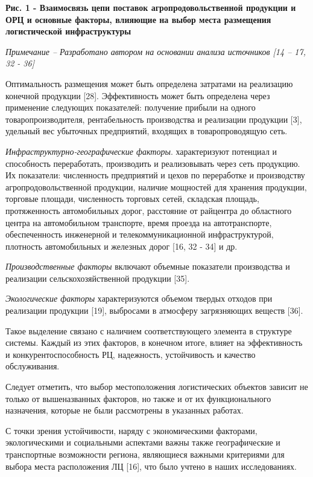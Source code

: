 {\bfseries Рис. 1 - Взаимосвязь цепи поставок агропродовольственной
продукции и ОРЦ и основные факторы, влияющие на выбор места размещения
логистической инфраструктуры}

\emph{Примечание -- Разработано автором на основании анализа источников
{[}14 -- 17, 32 - 36{]}}

Оптимальность размещения может быть определена затратами на реализацию
конечной продукции {[}28{]}. Эффективность может быть определена через
применение следующих показателей: получение прибыли на одного
товаропроизводителя, рентабельность производства и реализации продукции
{[}3{]}, удельный вес убыточных предприятий, входящих в товаропроводящую
сеть.

\emph{Инфраструктурно-географические факторы}. характеризуют потенциал и
способность переработать, производить и реализовывать через сеть
продукцию. Их показатели: численность предприятий и цехов по переработке
и производству агропродовольственной продукции, наличие мощностей для
хранения продукции, торговые площади, численность торговых сетей,
складская площадь, протяженность автомобильных дорог, расстояние от
райцентра до областного центра на автомобильном транспорте, время
проезда на автотранспорте, обеспеченность инженерной и
телекоммуникационной инфраструктурой, плотность автомобильных и железных
дорог {[}16, 32 - 34{]} и др.

\emph{Производственные факторы} включают объемные показатели
производства и реализации сельскохозяйственной продукции {[}35{]}.

\emph{Экологические факторы} характеризуются объемом твердых отходов при
реализации продукции {[}19{]}, выбросами в атмосферу загрязняющих
веществ {[}36{]}.

Такое выделение связано с наличием соответствующего элемента в структуре
системы. Каждый из этих факторов, в конечном итоге, влияет на
эффективность и конкурентоспособность РЦ, надежность, устойчивость и
качество обслуживания.

Следует отметить, что выбор местоположения логистических объектов
зависит не только от вышеназванных факторов, но также и от их
функционального назначения, которые не были рассмотрены в указанных
работах.

С точки зрения устойчивости, наряду с экономическими факторами,
экологическими и социальными аспектами важны также географические и
транспортные возможности региона, являющиеся важными критериями для
выбора места расположения ЛЦ {[}16{]}, что было учтено в наших
исследованиях.

